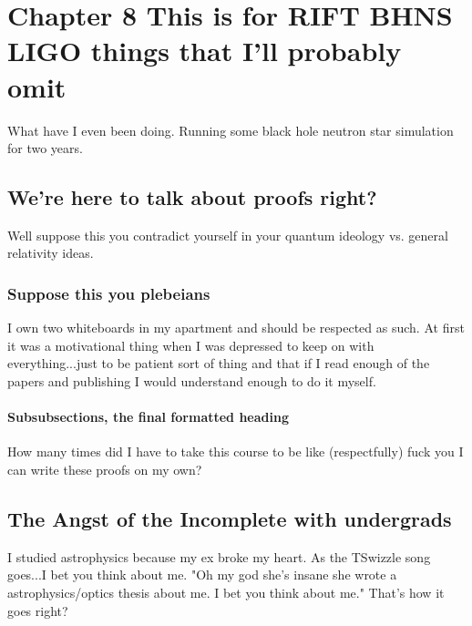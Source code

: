 \chapter{Chapter 8 This is for RIFT BHNS LIGO things that I'll probably omit}

What have I even been doing. Running some black hole neutron star simulation for two years. 

\section[Shorter Title]{We're here to talk about proofs right?}

Well suppose this you contradict yourself in your quantum ideology vs. general relativity ideas. 





\subsection{Suppose this you plebeians}

I own two whiteboards in my apartment and should be respected as such. At first it was a motivational thing when I was depressed to keep on with everything...just to be patient sort of thing and that if I read enough of the papers and publishing I would understand enough to do it myself. 

\subsubsection{Subsubsections, the final formatted heading}

How many times did I have to take this course to be like (respectfully) fuck you I can write these proofs on my own?

\section{The Angst of the Incomplete with undergrads}

I studied astrophysics because my ex broke my heart. As the TSwizzle song goes...I bet you think about me. "Oh my god she's insane she wrote a astrophysics/optics thesis about me. I bet you think about me." That's how it goes right?